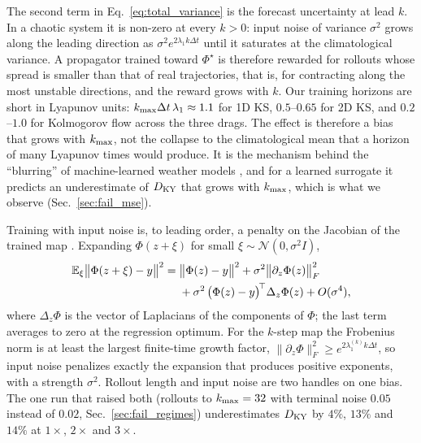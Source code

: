 The second term in Eq.~\eqref{eq:total_variance} is the forecast
uncertainty at lead $k$. In a chaotic system it is non-zero at every
$k>0$: input noise of variance $\sigma^2$ grows along the leading
direction as $\sigma^2 e^{2\lambda_1 k\Delta t}$ until it saturates at the
climatological variance. A propagator trained toward $\Phi^\star$ is
therefore rewarded for rollouts whose spread is smaller than that of
real trajectories, that is, for contracting along the most unstable
directions, and the reward grows with $k$. Our training horizons are
short in Lyapunov units: $k_{\max}\Delta t\,\lambda_1\approx1.1$ for 1D KS,
$0.5$--$0.65$ for 2D KS, and $0.2$--$1.0$ for Kolmogorov flow across the
three drags. The effect is therefore a bias that grows with $k_{\max}$,
not the collapse to the climatological mean that a horizon of many
Lyapunov times would produce. It is the mechanism behind the
``blurring'' of machine-learned weather models
\citep{lam2023graphcast,bonavita2024}, and for a learned surrogate it
predicts an underestimate of $D_{\mathrm{KY}}$ that grows with $k_{\max}$, which is
what we observe (Sec.~\ref{sec:fail_mse}).

\begin{remark}
\label{rem:noise_penalty}
Training with input noise is, to leading order, a penalty on the
Jacobian of the trained map \citep{bishop1995}. Expanding
$\Phi(z+\xi)$ for small $\xi\sim\mathcal N(0,\sigma^2 I)$,
\begin{equation}
\begin{split}
  \mathbb{E}_\xi\big\|\Phi(z+\xi)-y\big\|^2
  ={}& \big\|\Phi(z)-y\big\|^2 + \sigma^2\big\|\partial_z\Phi(z)\big\|_F^2\\
  &+ \sigma^2\,\big(\Phi(z)-y\big)^{\!\top}\Delta_z\Phi(z) + O(\sigma^4),
\end{split}
  \label{eq:noise_penalty}
\end{equation}
where $\Delta_z\Phi$ is the vector of Laplacians of the components of
$\Phi$; the last term averages to zero at the regression optimum. For the
$k$-step map the Frobenius norm is at least the largest finite-time
growth factor, $\|\partial_z\Phi\|_F^2\ge e^{2\lambda^{(k)}_1 k\Delta t}$, so
input noise penalizes exactly the expansion that produces positive
exponents, with a strength $\sigma^2$. Rollout length and input noise
are two handles on one bias. The one run that raised both (rollouts to
$k_{\max}=32$ with terminal noise $0.05$ instead of $0.02$,
Sec.~\ref{sec:fail_regimes}) underestimates $D_{\mathrm{KY}}$ by $4\%$, $13\%$ and
$14\%$ at $1\times$, $2\times$ and $3\times$.
\end{remark}


